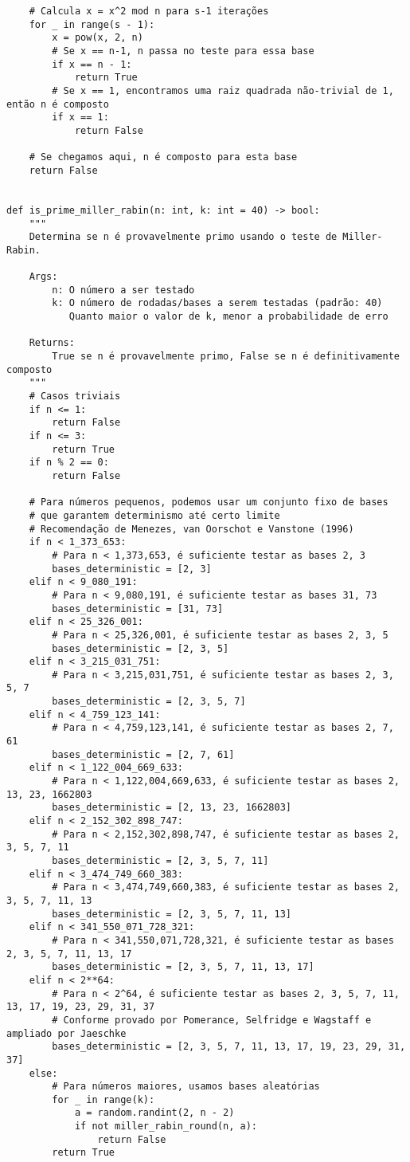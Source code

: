 \begin{verbatim}
    # Calcula x = x^2 mod n para s-1 iterações
    for _ in range(s - 1):
        x = pow(x, 2, n)
        # Se x == n-1, n passa no teste para essa base
        if x == n - 1:
            return True
        # Se x == 1, encontramos uma raiz quadrada não-trivial de 1, então n é composto
        if x == 1:
            return False
    
    # Se chegamos aqui, n é composto para esta base
    return False


def is_prime_miller_rabin(n: int, k: int = 40) -> bool:
    """
    Determina se n é provavelmente primo usando o teste de Miller-Rabin.
    
    Args:
        n: O número a ser testado
        k: O número de rodadas/bases a serem testadas (padrão: 40)
           Quanto maior o valor de k, menor a probabilidade de erro
    
    Returns:
        True se n é provavelmente primo, False se n é definitivamente composto
    """
    # Casos triviais
    if n <= 1:
        return False
    if n <= 3:
        return True
    if n % 2 == 0:
        return False
    
    # Para números pequenos, podemos usar um conjunto fixo de bases
    # que garantem determinismo até certo limite
    # Recomendação de Menezes, van Oorschot e Vanstone (1996)
    if n < 1_373_653:
        # Para n < 1,373,653, é suficiente testar as bases 2, 3
        bases_deterministic = [2, 3]
    elif n < 9_080_191:
        # Para n < 9,080,191, é suficiente testar as bases 31, 73
        bases_deterministic = [31, 73]
    elif n < 25_326_001:
        # Para n < 25,326,001, é suficiente testar as bases 2, 3, 5
        bases_deterministic = [2, 3, 5]
    elif n < 3_215_031_751:
        # Para n < 3,215,031,751, é suficiente testar as bases 2, 3, 5, 7
        bases_deterministic = [2, 3, 5, 7]
    elif n < 4_759_123_141:
        # Para n < 4,759,123,141, é suficiente testar as bases 2, 7, 61
        bases_deterministic = [2, 7, 61]
    elif n < 1_122_004_669_633:
        # Para n < 1,122,004,669,633, é suficiente testar as bases 2, 13, 23, 1662803
        bases_deterministic = [2, 13, 23, 1662803]
    elif n < 2_152_302_898_747:
        # Para n < 2,152,302,898,747, é suficiente testar as bases 2, 3, 5, 7, 11
        bases_deterministic = [2, 3, 5, 7, 11]
    elif n < 3_474_749_660_383:
        # Para n < 3,474,749,660,383, é suficiente testar as bases 2, 3, 5, 7, 11, 13
        bases_deterministic = [2, 3, 5, 7, 11, 13]
    elif n < 341_550_071_728_321:
        # Para n < 341,550,071,728,321, é suficiente testar as bases 2, 3, 5, 7, 11, 13, 17
        bases_deterministic = [2, 3, 5, 7, 11, 13, 17]
    elif n < 2**64:
        # Para n < 2^64, é suficiente testar as bases 2, 3, 5, 7, 11, 13, 17, 19, 23, 29, 31, 37
        # Conforme provado por Pomerance, Selfridge e Wagstaff e ampliado por Jaeschke
        bases_deterministic = [2, 3, 5, 7, 11, 13, 17, 19, 23, 29, 31, 37]
    else:
        # Para números maiores, usamos bases aleatórias
        for _ in range(k):
            a = random.randint(2, n - 2)
            if not miller_rabin_round(n, a):
                return False
        return True
    

\end{verbatim}

